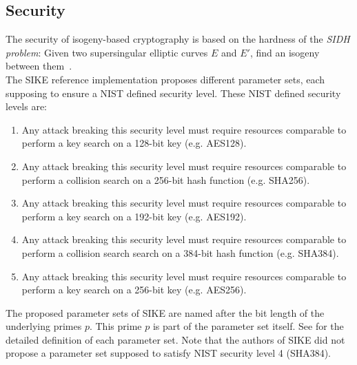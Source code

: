 \subsection{Security}\label{sidh_security}
The security of isogeny-based cryptography is based on the hardness of the \textit{\gls{SIDH} problem}: Given two supersingular elliptic curves $E$ and $E'$, find an isogeny between them~\parencite{sike2020spec}. 
\\
The \gls{SIKE} reference implementation proposes different parameter sets, each supposing to ensure a \gls{NIST} defined security level. These \gls{NIST} defined security levels are:
\begin{enumerate}[{label=Level \arabic*:},align=left]
\itemsep0em 
	\item Any attack breaking this security level must require resources comparable to perform a key search on a 128-bit key (e.g. AES128).
	\item Any attack breaking this security level must require resources comparable to perform a collision search on a 256-bit hash function (e.g. SHA256).
	\item Any attack breaking this security level must require resources comparable to perform a key search on a 192-bit key (e.g. AES192).
	\item Any attack breaking this security level must require resources comparable to perform a collision search search on a 384-bit hash function (e.g. SHA384).
	\item Any attack breaking this security level must require resources comparable to perform a key search on a 256-bit key (e.g. AES256).
\end{enumerate}
The proposed parameter sets of \gls{SIKE} are named after the bit length of the underlying primes $p$. This prime $p$ is part of the parameter set itself. See \parencite{sike2020spec} for the detailed definition of each parameter set. Note that the authors of SIKE did not propose a parameter set supposed to satisfy \gls{NIST} security level 4 (SHA384).


